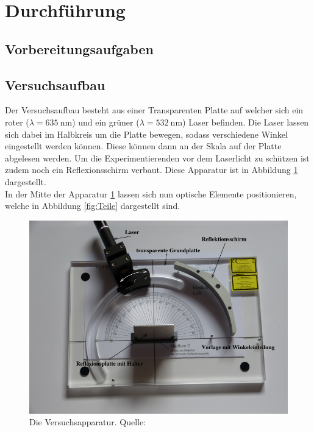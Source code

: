 \section{Durchführung}
\label{sec:Durchführung}

\subsection{Vorbereitungsaufgaben}
\label{sec:vorbereitung}

\subsection{Versuchsaufbau}
\label{sec:aufbau}
Der Versuchsaufbau besteht aus einer Transparenten Platte auf welcher sich ein roter
($\lambda=\SI{635}{\nano\metre}$) und ein grüner ($\lambda=\SI{532}{\nano\metre}$) Laser 
befinden. Die Laser lassen sich dabei im Halbkreis um die Platte bewegen, sodass verschiedene
Winkel eingestellt werden können. Diese können dann an der Skala auf der Platte abgelesen werden.
Um die Experimentierenden vor dem Laserlicht zu schützen ist zudem noch ein Reflexionsschirm
verbaut. Diese Apparatur ist in Abbildung \ref{fig:Aufbau} dargestellt.
\\\noindent 
In der Mitte der Apparatur \ref{fig:Aufbau} lassen sich nun optische Elemente positionieren, welche
in Abbildung \ref{fig:Teile} dargestellt sind. 
\begin{figure}[H]
    \centering
    \includegraphics[scale = 0.3]{pictures/Aufbau.png}
    \caption{Die Versuchsapparatur. Quelle: \cite{AP01}}
    \label{fig:Aufbau}
\end{figure}
